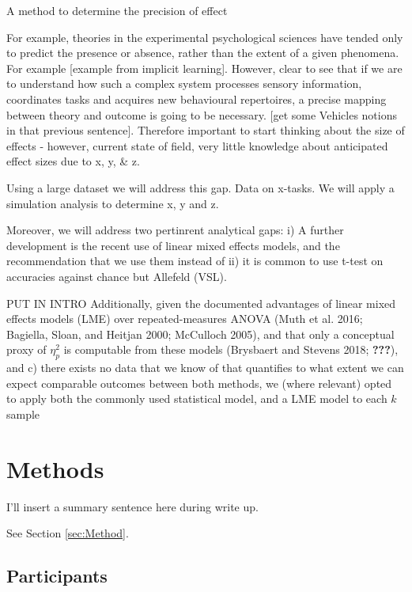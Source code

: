 \documentclass{article}
\begin{document}
A method to determine the precision of effect

For example, theories in the experimental psychological sciences have
tended only to predict the presence or absence, rather than the extent
of a given phenomena. For example {[}example from implicit learning{]}.
However, clear to see that if we are to understand how such a complex
system processes sensory information, coordinates tasks and acquires new
behavioural repertoires, a precise mapping between theory and outcome is
going to be necessary. {[}get some Vehicles notions in that previous
sentence{]}. Therefore important to start thinking about the size of
effects - however, current state of field, very little knowledge about
anticipated effect sizes due to x, y, \& z.

Using a large dataset we will address this gap. Data on x-tasks. We will
apply a simulation analysis to determine x, y and z.

Moreover, we will address two pertinrent analytical gaps: i) A further
development is the recent use of linear mixed effects models, and the
recommendation that we use them instead of ii) it is common to use
t-test on accuracies against chance but Allefeld (VSL).

PUT IN INTRO Additionally, given the documented advantages of linear
mixed effects models (LME) over repeated-measures ANOVA (Muth et al.
2016; Bagiella, Sloan, and Heitjan 2000; McCulloch 2005), and that only
a conceptual proxy of \(\eta_{p}^{2}\) is computable from these models
(Brysbaert and Stevens 2018; {\textbf{???}}), and c) there exists no
data that we know of that quantifies to what extent we can expect
comparable outcomes between both methods, we (where relevant) opted to
apply both the commonly used statistical model, and a LME model to each
\(k\) sample

\hypertarget{methods}{%
\section{Methods}\label{methods}}

I'll insert a summary sentence here during write up.

\label{sec:Method}

See Section \ref{sec:Method}.

\hypertarget{participants}{%
\subsection{Participants}\label{participants}}
\end{document}

